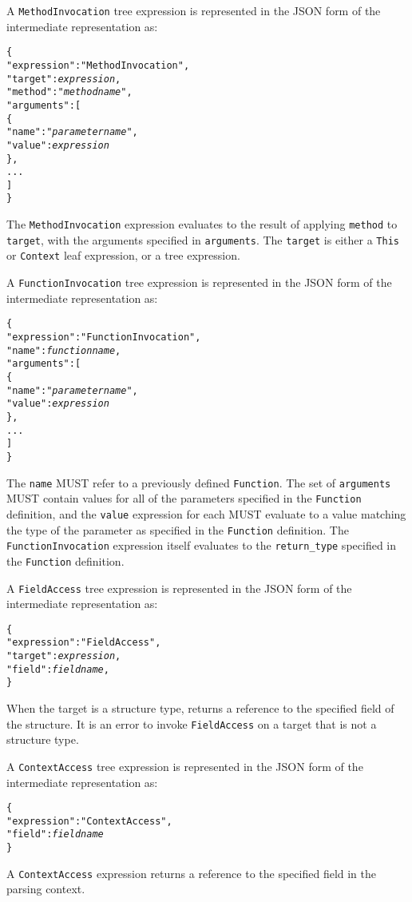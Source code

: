 \documentclass[10pt,twocolumn,a4paper]{article}
\newcommand{\code}[1]{\texttt{#1}}
\begin{document}
A \code{MethodInvocation} tree expression is represented in the JSON form of the
intermediate representation as:
\footnotesize
\begin{alltt}
  \{
    "expression"   : "MethodInvocation",
    "target"       : \emph{expression},
    "method"       : "\emph{method name}",
    "arguments"    : [
      \{
        "name"  : "\emph{parameter name}",
        "value" : \emph{expression}
      \},
      ...
    ]
  \}
\end{alltt}
\normalsize
The \code{MethodInvocation} expression evaluates to the result of applying \code{method}
to \code{target}, with the arguments specified in \code{arguments}. The \code{target} is
either a \code{This} or \code{Context} leaf expression, or a tree expression.

A \code{FunctionInvocation} tree expression is represented in the JSON form of the
intermediate representation as:
\footnotesize
\begin{alltt}
  \{
    "expression"   : "FunctionInvocation",
    "name"         : \emph{function name},
    "arguments"    : [
      \{
        "name"  : "\emph{parameter name}",
        "value" : \emph{expression}
      \},
      ...
    ]
  \}
\end{alltt}
\normalsize
The \code{name} MUST refer to a previously defined \code{Function}. The set
of \code{arguments} MUST contain values for all of the parameters specified
in the \code{Function} definition, and the \code{value} expression for each
MUST evaluate to a value matching the type of the parameter as specified in
the \code{Function} definition. The \code{FunctionInvocation} expression
itself evaluates to the \code{return\_type} specified in the
\code{Function} definition.

A \code{FieldAccess} tree expression is represented in the JSON form of the
intermediate representation as:
\footnotesize
\begin{alltt}
  \{
    "expression"  : "FieldAccess",
    "target"      : \emph{expression},
    "field"       : \emph{field name},
  \}
\end{alltt}
\normalsize
When the target is a structure type, returns a reference to the specified
field of the structure.
It is an error to invoke \code{FieldAccess} on a target that is not a
structure type.

A \code{ContextAccess} tree expression is represented in the JSON form
of the intermediate representation as:
\footnotesize
\begin{alltt}
  \{
    "expression"  : "ContextAccess",
    "field"       : \emph{field name}
  \}
\end{alltt}
\normalsize
A \code{ContextAccess} expression returns a reference to the specified
field in the parsing context.
\end{document}
